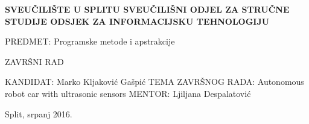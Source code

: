 %
%
\begin{titlepage}
\bfseries
\headerdata
{SVEUČILIŠTE U SPLITU}
{SVEUČILIŠNI ODJEL ZA STRUČNE STUDIJE}
{ODSJEK ZA INFORMACIJSKU TEHNOLOGIJU}

\vspace*{5cm}
\begin{flushleft}
{\Large   PREDMET: Programske metode i apstrakcije}
\end{flushleft}
\vspace*{3cm}
\begin{center}
{\Large  ZAVRŠNI RAD}
\end{center}
\vspace*{2cm}

\thesisdata
{KANDIDAT: Marko Kljaković Gašpić}  
{TEMA ZAVRŠNOG RADA: Autonomous robot car with ultrasonic sensors}
{MENTOR: Ljiljana Despalatović}

\begin{center}
\vfill
{\large Split, srpanj 2016.}
\end{center}
\end{titlepage}
%
%